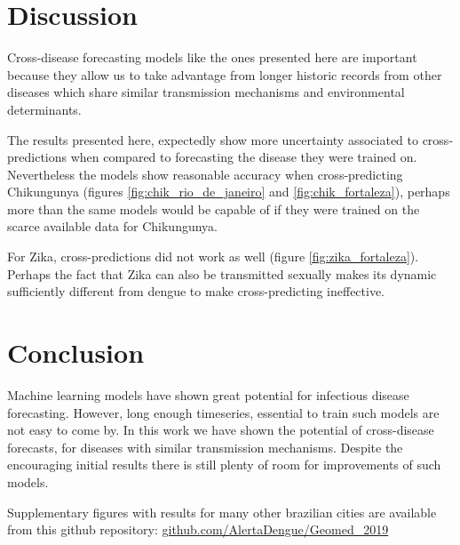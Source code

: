 \documentclass[a0,portrait]{a0poster}
\begin{document}
\begin{multicols}{3}
\section*{Discussion}
Cross-disease forecasting models like the ones presented here are important 
because they allow us to take advantage from longer historic records from other 
diseases which share similar transmission mechanisms and environmental 
determinants.

The results presented here, expectedly show more uncertainty associated to 
cross-predictions when compared to forecasting the disease they were trained 
on. Nevertheless the models show reasonable accuracy when cross-predicting 
Chikungunya (figures \ref{fig:chik_rio_de_janeiro} and 
\ref{fig:chik_fortaleza}), perhaps more than the same models would be capable of 
if they were trained on the scarce available data for Chikungunya.

For Zika, cross-predictions did not work as well (figure 
\ref{fig:zika_fortaleza}). Perhaps the fact that Zika can also be transmitted 
sexually\cite{coelho2016higher} makes its dynamic sufficiently different from 
dengue to make cross-predicting ineffective.

\section*{Conclusion}

Machine learning models have shown great potential for infectious disease 
forecasting. However, long enough timeseries, essential to train such models 
are not easy to come by. In this work we have shown the potential of 
cross-disease forecasts, for diseases with similar transmission mechanisms. 
Despite the encouraging initial results there is still plenty of room for 
improvements of such models. 

Supplementary figures with results for many other brazilian cities are 
available from this github repository: \url{github.com/AlertaDengue/Geomed_2019}











\end{multicols}
\end{document}

